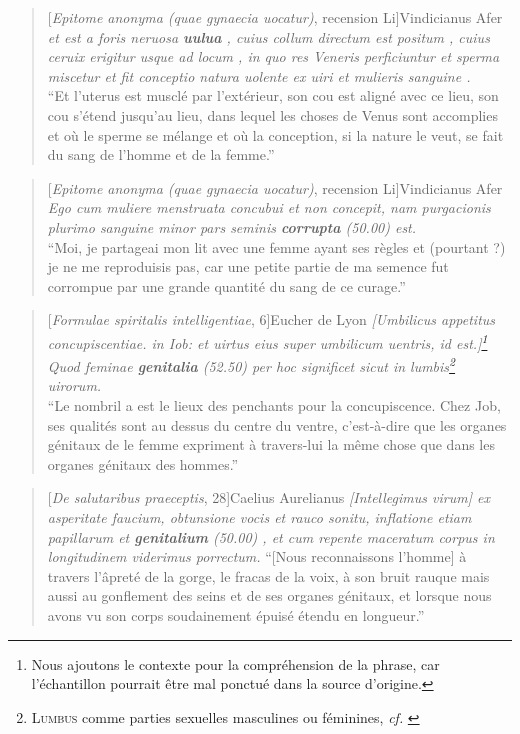 \begin{quote}[\textit{Epitome anonyma (quae gynaecia uocatur)}, recension Li]{Vindicianus Afer}
    \textit{et est a foris neruosa \textbf{uulua} , cuius collum directum est positum , cuius ceruix erigitur usque ad locum , in quo res Veneris perficiuntur et sperma miscetur et fit conceptio natura uolente ex uiri et mulieris sanguine .} \\
    \enquote{Et l'uterus est musclé par l'extérieur, son cou est aligné avec ce lieu, son cou s'étend jusqu'au lieu, dans lequel les choses de Venus sont accomplies et où le sperme se mélange et où la conception, si la nature le veut, se fait du sang de l'homme et de la femme.}
\end{quote}

\begin{quote}[\textit{Epitome anonyma (quae gynaecia uocatur)}, recension Li]{Vindicianus Afer}
    \textit{Ego cum muliere menstruata concubui et non concepit, nam purgacionis plurimo sanguine minor pars seminis \textbf{corrupta} (50.00) est.} \\
    \enquote{Moi, je partageai mon lit avec une femme ayant ses règles et (pourtant ?) je ne me reproduisis pas, car une petite partie de ma semence fut corrompue par une grande quantité du sang de ce curage.}
\end{quote}

\begin{quote}[\textit{Formulae spiritalis intelligentiae}, 6]{Eucher de Lyon}
    \textit{{[}Umbilicus appetitus concupiscentiae. in Iob: et uirtus eius super umbilicum uentris, id est.{]}\footnote{Nous ajoutons le contexte pour la compréhension de la phrase, car l'échantillon pourrait être mal ponctué dans la source d'origine.} Quod feminae \textbf{genitalia} (52.50) per hoc significet sicut in lumbis\footnote{\textsc{Lumbus} comme parties sexuelles masculines ou féminines, \textit{cf.} \textcite[p.~48]{adams}} uirorum.} \\
    \enquote{Le nombril a est le lieux des penchants pour la concupiscence. Chez Job, ses qualités sont au dessus du centre du ventre, c'est-à-dire que les organes génitaux de le femme expriment à travers-lui la même chose que dans les organes génitaux des hommes.}
\end{quote}

\begin{quote}[\textit{De salutaribus praeceptis}, 28]{Caelius Aurelianus}
    \textit{{[}Intellegimus virum{]} ex asperitate faucium, obtunsione vocis et rauco sonitu, inflatione etiam papillarum et \textbf{genitalium} (50.00) , et cum repente maceratum corpus in longitudinem viderimus porrectum.}
    \enquote{{[}Nous reconnaissons l'homme{]} à travers l'âpreté de la gorge, le fracas de la voix, à son bruit rauque mais aussi au gonflement des seins et de ses organes génitaux, et lorsque nous avons vu son corps soudainement épuisé étendu en longueur.}
\end{quote}

